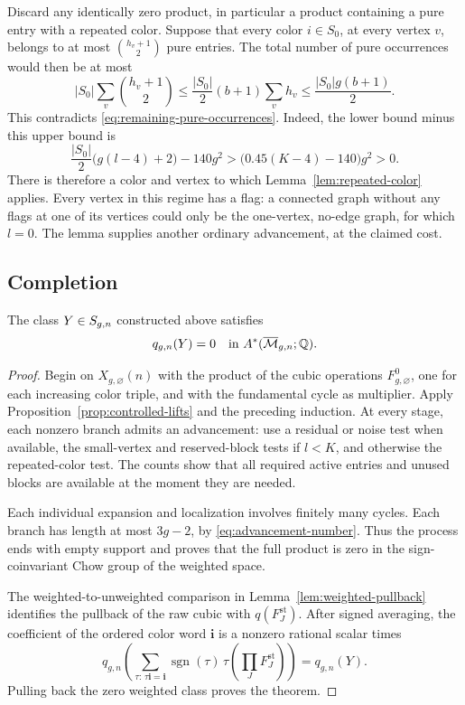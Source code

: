 Discard any identically zero product, in particular a product containing
a pure entry with a repeated color.  Suppose that every color
\(i\in S_0\), at every vertex \(v\), belongs to at most
\(\binom{h_v+1}{2}\) pure entries.  The total number of pure occurrences
would then be at most
\[
 |S_0|\sum_v\binom{h_v+1}{2}
 \le \frac{|S_0|}{2}(b+1)\sum_v h_v
 \le \frac{|S_0|g(b+1)}2.
\]
This contradicts \eqref{eq:remaining-pure-occurrences}.  Indeed, the
lower bound minus this upper bound is
\[
 \frac{|S_0|}{2}\bigl(g(l-4)+2\bigr)-140g^2
 >\bigl(0.45(K-4)-140\bigr)g^2>0.
\]
There is therefore a color and vertex to which
Lemma~\ref{lem:repeated-color} applies.
Every vertex in this regime has a flag: a connected graph without any
flags at one of its vertices could only be the one-vertex, no-edge
graph, for which \(l=0\).
The lemma supplies another ordinary advancement, at the claimed cost.

\subsection{Completion}

\begin{theorem}
\label{thm:chow-vanishing}
The class \(Y\in S_{g,n}\) constructed above satisfies
\[
 q_{g,n}(Y)=0
 \quad\text{in }A^*(\overline{\mathcal M}_{g,n};\mathbb Q).
\]
\end{theorem}

\begin{proof}
Begin on \(X_{g,\varnothing}(n)\) with the product of the cubic
operations \(F^0_{g,\varnothing}\), one for each increasing color triple,
and with the fundamental cycle as multiplier.  Apply
Proposition~\ref{prop:controlled-lifts} and the preceding induction.
At every stage, each nonzero branch admits an advancement: use a
residual or noise test when available, the small-vertex and reserved-block
tests if \(l<K\), and otherwise the repeated-color test.
The counts show that all required active entries and unused blocks are
available at the moment they are needed.

Each individual expansion and localization involves finitely many
cycles.  Each branch has length at most \(3g-2\), by
\eqref{eq:advancement-number}.  Thus the process ends with empty
support and proves that the full product is zero in the sign-coinvariant
Chow group of the weighted space.

The weighted-to-unweighted comparison in
Lemma~\ref{lem:weighted-pullback} identifies the pullback of the
raw cubic with \(q(F_J^{\mathrm{st}})\).  After signed averaging, the
coefficient of the ordered color word \(\mathbf i\) is a nonzero
rational scalar times
\[
 q_{g,n}\!\left(
 \sum_{\tau:\,\tau\mathbf i=\mathbf i}
   \operatorname{sgn}(\tau)\,
   \tau\!\left(\prod_J F_J^{\mathrm{st}}\right)
 \right)=q_{g,n}(Y).
\]
Pulling back the zero weighted class proves the theorem.
\end{proof}

